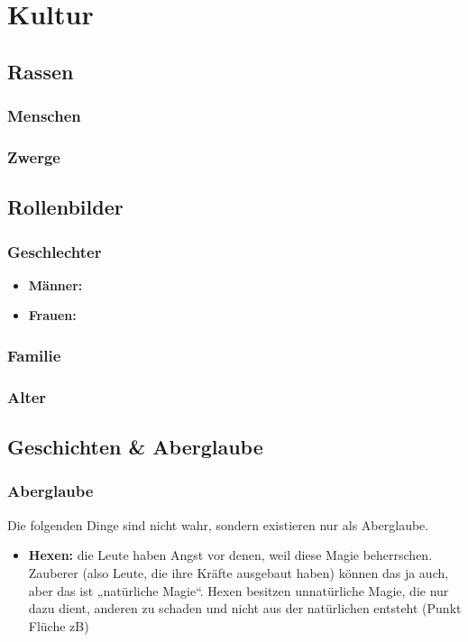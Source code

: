 \chapter{Kultur}
\section{Rassen}
\subsection{Menschen}
\subsection{Zwerge}

\section{Rollenbilder}
\subsection{Geschlechter}
\begin{itemize}
	\item \textbf{Männer:} 
	\item \textbf{Frauen:}
\end{itemize}
\subsection{Familie}
\subsection{Alter}

\section{Geschichten \& Aberglaube}
\subsection{Aberglaube}
Die folgenden Dinge sind nicht wahr, sondern existieren nur als Aberglaube.
\begin{itemize}
	\item \textbf{Hexen:} die Leute haben Angst vor denen, weil diese Magie beherrschen. Zauberer (also Leute, die ihre Kräfte ausgebaut haben) können das ja auch, aber das ist „natürliche Magie“. Hexen besitzen unnatürliche Magie, die nur dazu dient, anderen zu schaden und nicht aus der natürlichen entsteht (Punkt Flüche zB)
\end{itemize}